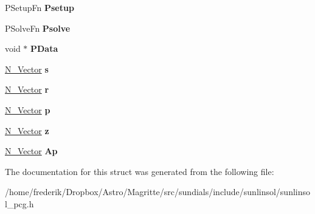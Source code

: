 \begin{DoxyCompactItemize}
P\+Setup\+Fn {\bfseries Psetup}
\item 
\mbox{\label{struct__SUNLinearSolverContent__PCG_adb0aed51837800dfab5202c15148ba17}} 
P\+Solve\+Fn {\bfseries Psolve}
\item 
\mbox{\label{struct__SUNLinearSolverContent__PCG_a239b705ce75f3694da06323672b4a38c}} 
void $\ast$ {\bfseries P\+Data}
\item 
\mbox{\label{struct__SUNLinearSolverContent__PCG_a7df242cbd2684a47870631f3cc1a357f}} 
\mbox{\hyperlink{struct__generic__N__Vector}{N\+\_\+\+Vector}} {\bfseries s}
\item 
\mbox{\label{struct__SUNLinearSolverContent__PCG_a7cfe448749860cfb36a94581031d420e}} 
\mbox{\hyperlink{struct__generic__N__Vector}{N\+\_\+\+Vector}} {\bfseries r}
\item 
\mbox{\label{struct__SUNLinearSolverContent__PCG_a2d2596a942fb7ea5e9d2a616a6c67c11}} 
\mbox{\hyperlink{struct__generic__N__Vector}{N\+\_\+\+Vector}} {\bfseries p}
\item 
\mbox{\label{struct__SUNLinearSolverContent__PCG_a62bf6a869c5dda5d08c1ea0b09b8c7d9}} 
\mbox{\hyperlink{struct__generic__N__Vector}{N\+\_\+\+Vector}} {\bfseries z}
\item 
\mbox{\label{struct__SUNLinearSolverContent__PCG_a90087131015c7f7616bda8df3029feba}} 
\mbox{\hyperlink{struct__generic__N__Vector}{N\+\_\+\+Vector}} {\bfseries Ap}
\end{DoxyCompactItemize}


The documentation for this struct was generated from the following file\+:\begin{DoxyCompactItemize}
\item 
/home/frederik/\+Dropbox/\+Astro/\+Magritte/src/sundials/include/sunlinsol/sunlinsol\+\_\+pcg.\+h\end{DoxyCompactItemize}
